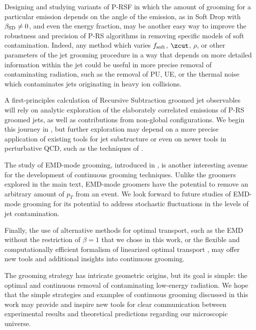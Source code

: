 \documentclass[letterpaper,11pt]{article}
\begin{document}
   Designing and studying variants of P-RSF in which the amount of grooming for a particular emission depends on the angle of the emission, as in Soft Drop with \(\beta_{\rm SD} \neq 0\), and even the energy fraction, may be another easy way to improve the robustness and precision of P-RS algorithms in removing specific models of soft contamination.
   Indeed, any method which varies \(f_{\rm soft}\), \(\zcut\), \(\rho\), or other parameters of the jet grooming procedure in a way that depends on more detailed information within the jet could be useful in more precise removal of contaminating radiation, such as the removal of PU, UE, or the thermal noise which contaminates jets originating in heavy ion collisions.
   
       A first-principles calculation of Recursive Subtraction groomed jet observables will rely on analytic exploration of the elaborately correlated emissions of P-RS groomed jets, as well as contributions from non-global configurations.
    We begin this journey in , but further exploration may depend on a more precise application of existing tools for jet substructure or even on newer tools in perturbative QCD, such as the techniques of .
    
   The study of EMD-mode \PIRANHA{} grooming, introduced in , is another interesting avenue for the development of continuous grooming techniques.
   Unlike the \PIRANHA{} groomers explored in the main text, EMD-mode \PIRANHA{} groomers have the potential to remove an arbitrary amount of \(p_T\) from an event.
   We look forward to future studies of EMD-mode grooming for its potential to address stochastic fluctuations in the levels of jet contamination.
   
   Finally, the use of alternative methods for optimal transport, such as the EMD without the restriction of \(\beta = 1\) that we chose in this work, or the flexible and computationally efficient formalism of linearized optimal transport \cite{Cai:2020vzx,Cai:2021hnn,cai2022linearized,sarrazin2023linearized}, may offer new tools and additional insights into continuous grooming.
   
The \PIRANHA{} grooming strategy has intricate geometric origins, but its goal is simple: the optimal and continuous removal of contaminating low-energy radiation.
%
We hope that the simple strategies and examples of continuous grooming discussed in this work may provide and inspire new tools for clear communication between experimental results and theoretical predictions regarding our microscopic universe.
\end{document}

